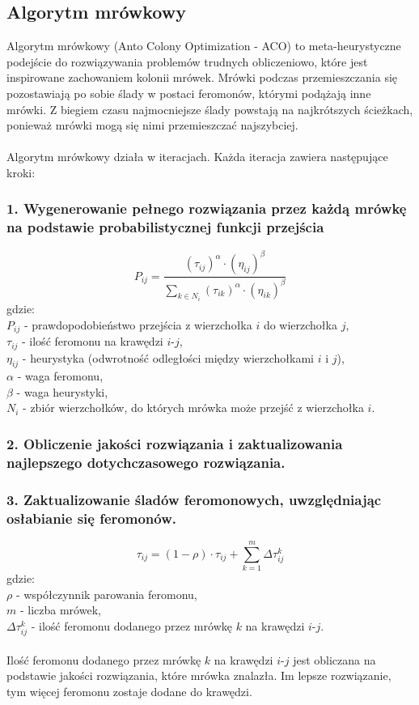 \documentclass{article}
\begin{document}
\subsection{Algorytm mrówkowy}
Algorytm mrówkowy (Anto Colony Optimization - ACO) \cite{dorigo} to meta-heurystyczne podejście do rozwiązywania problemów trudnych obliczeniowo, które jest inspirowane zachowaniem kolonii mrówek. Mrówki podczas przemieszczania się pozostawiają po sobie ślady w postaci feromonów, którymi podążają inne mrówki. Z biegiem czasu najmocniejsze ślady powstają na najkrótszych ścieżkach, ponieważ mrówki mogą się nimi przemieszczać najszybciej.
\\ \\
Algorytm mrówkowy działa w iteracjach. Każda iteracja zawiera następujące kroki:
\subsubsection*{1. Wygenerowanie pełnego rozwiązania przez każdą mrówkę na podstawie probabilistycznej funkcji przejścia}
\begin{equation}
    P_{ij} = \frac{(\tau_{ij})^\alpha \cdot (\eta_{ij})^\beta}{\sum_{k \in N_i} (\tau_{ik})^\alpha \cdot (\eta_{ik})^\beta}
\end{equation}
gdzie:
\\
$P_{ij}$ - prawdopodobieństwo przejścia z wierzchołka $i$ do wierzchołka $j$,
\\
$\tau_{ij}$ - ilość feromonu na krawędzi $i$-$j$,
\\
$\eta_{ij}$ - heurystyka (odwrotność odległości między wierzchołkami $i$ i $j$),
\\
$\alpha$ - waga feromonu,
\\
$\beta$ - waga heurystyki,
\\
$N_i$ - zbiór wierzchołków, do których mrówka może przejść z wierzchołka $i$.

\subsubsection*{2. Obliczenie jakości rozwiązania i zaktualizowania najlepszego dotychczasowego rozwiązania.}

\subsubsection*{3. Zaktualizowanie śladów feromonowych, uwzględniając osłabianie się feromonów.}

\begin{equation}
    \tau_{ij} = (1 - \rho) \cdot \tau_{ij} + \sum_{k=1}^{m} \Delta\tau_{ij}^k
\end{equation}
gdzie:
\\
$\rho$ - współczynnik parowania feromonu, 
\\
$m$ - liczba mrówek, 
\\
$\Delta\tau_{ij}^k$ - ilość feromonu dodanego przez mrówkę $k$ na krawędzi $i$-$j$.
\\ \\
Ilość feromonu dodanego przez mrówkę $k$ na krawędzi $i$-$j$ jest obliczana na podstawie jakości rozwiązania, które mrówka znalazła. Im lepsze rozwiązanie, tym więcej feromonu zostaje dodane do krawędzi.
\end{document}
